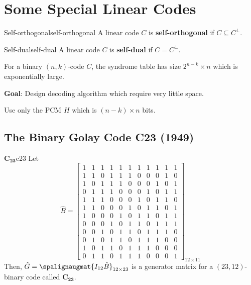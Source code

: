 \chapter{Some Special Linear Codes}

\begin{Definition}{Self-orthogonal}{self-orthogonal}
    A linear code $ C $ is \textbf{self-orthogonal} if $ C\subseteq C^{\perp} $.
\end{Definition}

\begin{Definition}{Self-dual}{self-dual}
    A linear code $ C $ is \textbf{self-dual} if $ C=C^{\perp} $.
\end{Definition}

For a binary $ (n,k) $-code $ C $, the syndrome table has
size $ 2^{n-k}\times n $ which is exponentially large.

\textbf{Goal}: Design decoding algorithm which require
very little space.

\begin{Example}{}{}
    Use only the PCM $ H $ which is $ (n-k)\times n $ bits.
\end{Example}

\section{The Binary Golay Code C23 (1949)}
\begin{Definition}{$\bm{C_{23}}$}{c23}
    Let
    \[
        \hat{B}=
        \left[
            \begin{array}{cccccccccccc}
                1 & 1 & 1 & 1 & 1 & 1 & 1 & 1 & 1 & 1 & 1 \\
                1 & 1 & 0 & 1 & 1 & 1 & 0 & 0 & 0 & 1 & 0 \\
                1 & 0 & 1 & 1 & 1 & 0 & 0 & 0 & 1 & 0 & 1 \\
                0 & 1 & 1 & 1 & 0 & 0 & 0 & 1 & 0 & 1 & 1 \\
                1 & 1 & 1 & 0 & 0 & 0 & 1 & 0 & 1 & 1 & 0 \\
                1 & 1 & 0 & 0 & 0 & 1 & 0 & 1 & 1 & 0 & 1 \\
                1 & 0 & 0 & 0 & 1 & 0 & 1 & 1 & 0 & 1 & 1 \\
                0 & 0 & 0 & 1 & 0 & 1 & 1 & 0 & 1 & 1 & 1 \\
                0 & 0 & 1 & 0 & 1 & 1 & 0 & 1 & 1 & 1 & 0 \\
                0 & 1 & 0 & 1 & 1 & 0 & 1 & 1 & 1 & 0 & 0 \\
                1 & 0 & 1 & 1 & 0 & 1 & 1 & 1 & 0 & 0 & 0 \\
                0 & 1 & 1 & 0 & 1 & 1 & 1 & 0 & 0 & 0 & 1
            \end{array}
            \right]_{12\times{} 11} \]
    Then, $ \hat{G}=\spalignaugmat{I_{12} \hat{B}}_{12\times 23} $
    is a generator matrix for a $ (23,12) $-binary code called $ \bm{C_{23}} $.
\end{Definition}


